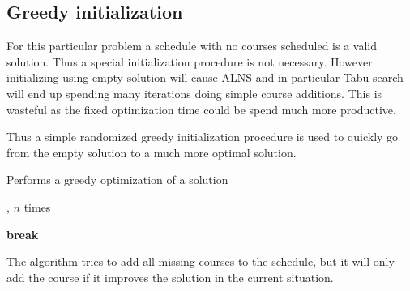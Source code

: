 \subsection{Greedy initialization}

For this particular problem a schedule with no courses scheduled is a valid solution. Thus a special initialization procedure is not necessary. However initializing using empty solution will cause ALNS and in particular Tabu search will end up spending many iterations doing simple course additions. This is wasteful as the fixed optimization time could be spend much more productive.

Thus a simple randomized greedy initialization procedure is used to quickly go from the empty solution to a much more optimal solution.

\begin{algorithm}[H]
  \caption{Performs a greedy optimization of a solution}
  \begin{algorithmic}[1]
       
        \State {}, $n$ times
      \EndFor
      \State
      
       
      \State
    
          \State
            \State {} 
            \State \textbf{break}
          \Else
            \State {} 
          \EndIf
        \EndFor
      \EndFor
    \EndFunction
  \end{algorithmic}
\end{algorithm}

The algorithm tries to add all missing courses to the schedule, but it will only add the course if it improves the solution in the current situation.
